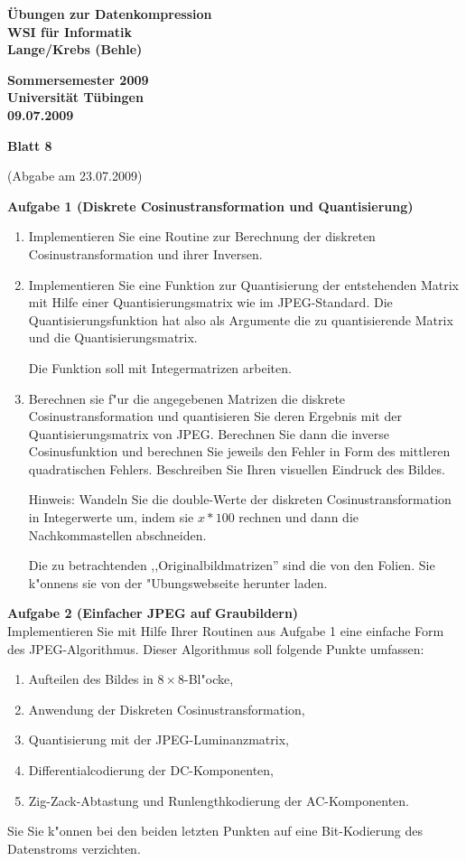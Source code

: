 \documentclass[a4paper]{article}
\def\header#1#2#3#4{\pagestyle{empty}
\noindent
\begin{minipage}[t]{0.6\textwidth}
\begin{flushleft}
\bf \"Ubungen zur Datenkompression\\
WSI f\"ur Informatik\\
Lange/Krebs (Behle)
\end{flushleft}
\end{minipage}
\begin{minipage}[t]{0.4\textwidth}
\begin{flushright}
\bf Sommersemester 2009\\
Universit\"at T\"ubingen\\
#2 %
\end{flushright}
\end{minipage}

\begin{center}
{\Large\bf Blatt #1}

{(Abgabe am #3)}
\end{center}
}
\begin{document}
\header{8}{09.07.2009}{23.07.2009}{}

\bigskip

\noindent

\bigskip


{\bf Aufgabe 1  \quad(Diskrete Cosinustransformation und Quantisierung)}\\
\begin{enumerate}
\item Implementieren Sie eine Routine zur Berechnung der diskreten Cosinustransformation und ihrer Inversen.

\item Implementieren Sie eine Funktion zur Quantisierung der entstehenden Matrix mit Hilfe einer Quantisierungsmatrix wie im JPEG-Standard. Die Quantisierungsfunktion hat also als Argumente die zu quantisierende Matrix und die Quantisierungsmatrix.

Die Funktion soll mit Integermatrizen arbeiten.

\item Berechnen sie f"ur die angegebenen Matrizen die diskrete Cosinustransformation und quantisieren Sie deren Ergebnis mit der Quantisierungsmatrix von JPEG. Berechnen Sie dann die inverse Cosinusfunktion und berechnen Sie jeweils den Fehler in Form des mittleren quadratischen Fehlers. Beschreiben Sie Ihren visuellen Eindruck des Bildes.

Hinweis: Wandeln Sie die double-Werte der diskreten Cosinustransformation in Integerwerte um, indem sie $x*100$ rechnen und dann die Nachkommastellen abschneiden.

Die zu betrachtenden ,,Originalbildmatrizen'' sind die von den Folien. Sie k"onnens sie von der "Ubungswebseite herunter laden.

\end{enumerate}


\bigskip


{\bf Aufgabe 2  \quad(Einfacher JPEG auf Graubildern)}\\
Implementieren Sie mit Hilfe Ihrer Routinen aus Aufgabe 1 eine einfache Form des JPEG-Algorithmus. Dieser Algorithmus soll folgende Punkte umfassen:
\begin{enumerate}
\item Aufteilen des Bildes in $8\times 8$-Bl"ocke,
\item Anwendung der Diskreten Cosinustransformation,
\item Quantisierung mit der JPEG-Luminanzmatrix,
\item Differentialcodierung der DC-Komponenten,
\item Zig-Zack-Abtastung und Runlengthkodierung der AC-Komponenten.
\end{enumerate}
Sie Sie k"onnen bei den beiden letzten Punkten auf eine Bit-Kodierung des Datenstroms verzichten.
\end{document}
